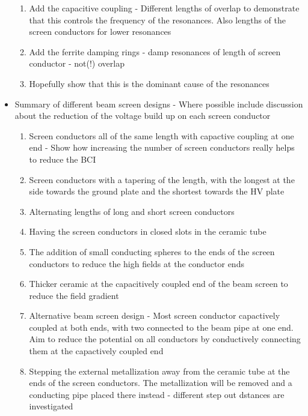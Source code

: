 \begin{itemize}
\begin{enumerate}
\item{Add the capacitive coupling - Different lengths of overlap to demonstrate that this controls the frequency of the resonances. Also lengths of the screen conductors for lower resonances}
\item{Add the ferrite damping rings - damp resonances of length of screen conductor - not(!) overlap}
\item{Hopefully show that this is the dominant cause of the resonances}
\end{enumerate}
\item{Summary of different beam screen designs - Where possible include discussion about the reduction of the voltage build up on each screen conductor}
\begin{enumerate}
\item{Screen conductors all of the same length with capactive coupling at one end - Show how increasing the number of screen conductors really helps to reduce the BCI}
\item{Screen conductors with a tapering of the length, with the longest at the side towards the ground plate and the shortest towards the HV plate}
\item{Alternating lengths of long and short screen conductors}
\item{Having the screen conductors in closed slots in the ceramic tube}
\item{The addition of small conducting spheres to the ends of the screen conductors to reduce the high fields at the conductor ends}
\item{Thicker ceramic at the capacitively coupled end of the beam screen to reduce the field gradient}
\item{Alternative beam screen design - Most screen conductor capactively coupled at both ends, with two connected to the beam pipe at one end. Aim to reduce the potential on all conductors by conductively connecting them at the capactively coupled end}
\item{Stepping the external metallization away from the ceramic tube at the ends of the screen conductors. The metallization will be removed and a conducting pipe placed there instead - different step out dstances are investigated}
\end{enumerate}


\end{itemize}
